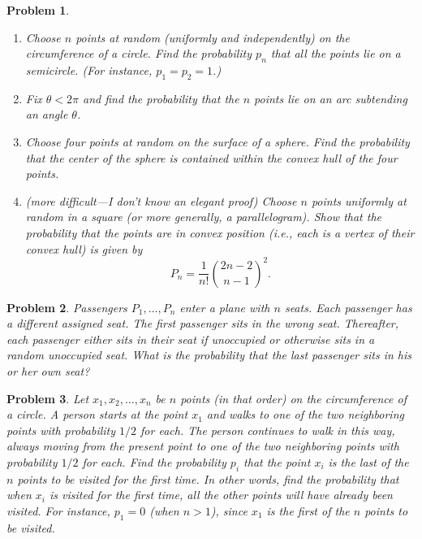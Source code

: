 \documentclass[12pt]{article}
\newtheorem{problem}{Problem}
\begin{document}
\begin{problem}
    \begin{enumerate}
        \item Choose $n$ points at random (uniformly and independently) on the circumference of a circle. Find the probability $p_n$ that all the points lie on a semicircle. (For instance, $p_1 = p_2 = 1$.)
        \item Fix $\theta < 2\pi$ and find the probability that the $n$ points lie on an arc subtending an angle $\theta$.
        \item Choose four points at random on the surface of a sphere. Find the probability that the center of the sphere is contained within the convex hull of the four points.
        \item (more difficult---I don’t know an elegant proof) Choose $n$ points uniformly at random in a square (or more generally, a parallelogram). Show that the probability that the points are in convex position (i.e., each is a vertex of their convex hull) is given by
        \[
        P_n = \frac{1}{n!} \binom{2n-2}{n-1}^2.
        \]
    \end{enumerate}
\end{problem}

\begin{problem}
Passengers $P_1,\ldots,P_n$ enter a plane with $n$ seats. Each passenger has a different assigned seat. The first passenger sits in the wrong seat. Thereafter, each passenger either sits in their seat if unoccupied or otherwise sits in a random unoccupied seat. What is the probability that the last passenger sits in his or her own seat?
\end{problem}

\begin{problem}
Let $x_1,x_2,\ldots,x_n$ be $n$ points (in that order) on the circumference of a circle. A person starts at the point $x_1$ and walks to one of the two neighboring points with probability $1/2$ for each. The person continues to walk in this way, always moving from the present point to one of the two neighboring points with probability $1/2$ for each. Find the probability $p_i$ that the point $x_i$ is the last of the $n$ points to be visited for the first time. In other words, find the probability that when $x_i$ is visited for the first time, all the other points will have already been visited. For instance, $p_1 = 0$ (when $n>1$), since $x_1$ is the first of the $n$ points to be visited.
\end{problem}
\end{document}
